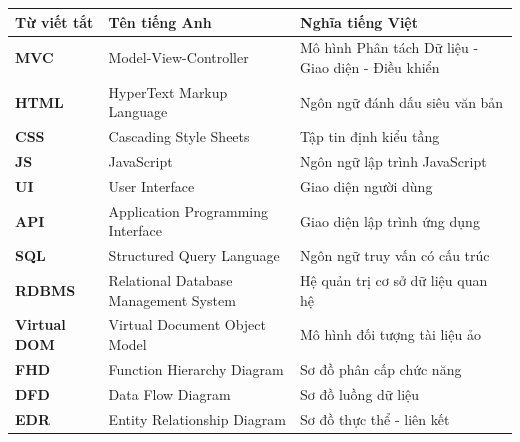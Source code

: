 \documentclass{article}
\begin{document}
	\begin{table}[H]
		\centering
		\renewcommand{\arraystretch}{1.3}
		\begin{tabular}{|p{4.5cm}|p{4.5cm}|p{4.5cm}|}
			\hline
			\textbf{Từ viết tắt} & \textbf{Tên tiếng Anh} & \textbf{Nghĩa tiếng Việt} \\ \hline
			\textbf{MVC} & Model-View-Controller & Mô hình Phân tách Dữ liệu - Giao diện - Điều khiển \\ \hline
			\textbf{HTML} & HyperText Markup Language & Ngôn ngữ đánh dấu siêu văn bản \\ \hline
			\textbf{CSS} & Cascading Style Sheets & Tập tin định kiểu tầng \\ \hline
			\textbf{JS} & JavaScript & Ngôn ngữ lập trình JavaScript \\ \hline
			\textbf{UI} & User Interface & Giao diện người dùng \\ \hline
			\textbf{API} & Application Programming Interface & Giao diện lập trình ứng dụng \\ \hline
			\textbf{SQL} & Structured Query Language & Ngôn ngữ truy vấn có cấu trúc \\ \hline
			\textbf{RDBMS} & Relational Database Management System & Hệ quản trị cơ sở dữ liệu quan hệ \\ \hline
			\textbf{Virtual DOM} & Virtual Document Object Model & Mô hình đối tượng tài liệu ảo \\ \hline
			\textbf{FHD} & Function Hierarchy Diagram & Sơ đồ phân cấp chức năng \\ \hline
			\textbf{DFD} & Data Flow Diagram & Sơ đồ luồng dữ liệu \\ \hline
			\textbf{EDR} & Entity Relationship Diagram & Sơ đồ thực thể - liên kết \\ \hline
		\end{tabular}
	\end{table}
	
	\newpage
	
	\renewcommand{\listfigurename}{DANH MỤC HÌNH VẼ}
	{\let\oldnumberline\numberline
		\renewcommand{\numberline}{Hình~\oldnumberline}
		\listoffigures} 
	\newpage
	
	\renewcommand{\listtablename}{DANH MỤC BẢNG BIỂU}
	{\let\oldnumberline\numberline
		\renewcommand{\numberline}{Bảng~\oldnumberline}
		\listoftables}
	\newpage
	
\end{document}
